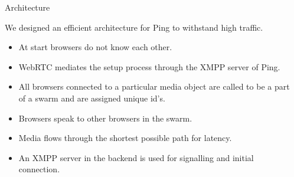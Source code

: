 \documentclass[final]{beamer}
\newlength{\onecolwid}
\newlength{\twocolwid}
\begin{document}
\begin{frame}[t]
\begin{columns}[t]
\begin{column}{\twocolwid} %

\begin{columns}[t,totalwidth=\twocolwid] %

\begin{column}{\onecolwid}\vspace{-.6in} %


\begin{block}{Architecture}

We designed an efficient architecture for Ping to withstand high traffic.

\begin{itemize}
\item At start browsers do not know each other.
\item WebRTC mediates the setup process through the XMPP server of Ping.
\item All browsers connected to a particular media object are called to be a part of a swarm and are assigned unique id's.
\item Browsers speak to other browsers in the swarm.
\item Media flows through the shortest possible path for latency.
\item An XMPP server in the backend is used for signalling and initial connection.
\end{itemize}



\end{block}


\end{column} %

\begin{column}{\onecolwid}\vspace{-.6in} %



\end{column}
\end{columns}
\end{column}
\end{columns}
\end{frame}
\end{document}
